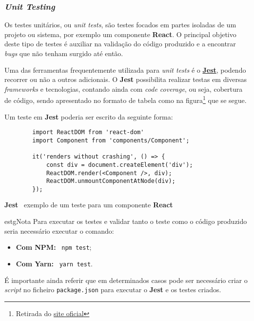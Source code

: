 \subsubsection{\textit{Unit Testing}}

Os testes unitários, ou \textit{unit tests}, são testes focados em partes isoladas de um projeto ou sistema, por exemplo um componente \textbf{React}. O principal objetivo deste tipo de testes é auxiliar na validação do código produzido e a encontrar \textit{bugs} que não tenham surgido até então.

Uma das ferramentas frequentemente utilizada para \textit{unit tests} é o \textbf{\href{https://jestjs.io/}{Jest}}, podendo recorrer ou não a outros \textit{} adicionais. O \textbf{Jest} possibilita realizar testas em diversas \textit{frameworks} e tecnologias, contando ainda com \textit{code coverage}, ou seja, cobertura de código, sendo apresentado no formato de tabela como na figura\footnote{Retirada do \href{https://jestjs.io/}{site oficial}} que se segue.


Um teste em \textbf{Jest} poderia ser escrito da seguinte forma:

\begin{longlisting}
	\begin{verbatim}
		import ReactDOM from 'react-dom'
		import Component from 'components/Component';

		it('renders without crashing', () => {
			const div = document.createElement('div');
			ReactDOM.render(<Component />, div);
			ReactDOM.unmountComponentAtNode(div);
		});
	\end{verbatim}

	\caption{\textbf{Jest} \textemdash~exemplo de um teste para um componente \textbf{React}}
\end{longlisting}

\begin{mybox}{estg}{Nota}
	Para executar os testes e validar tanto o teste como o código produzido seria necessário executar o comando:

	\begin{itemize}
		\item \textbf{Com NPM:} ~\verb|npm test|;
		\item \textbf{Com Yarn:} ~\verb|yarn test|.
	\end{itemize}

	É importante ainda referir que em determinados casos pode ser necessário criar o \textit{script} no ficheiro \texttt{package.json} para executar o \textbf{Jest} e os testes criados.
\end{mybox}

